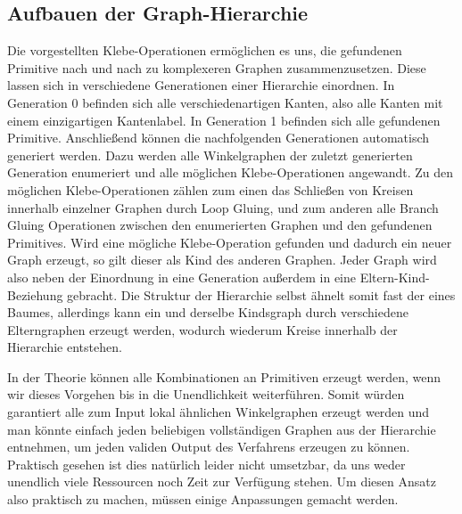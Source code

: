 \subsection{Aufbauen der Graph-Hierarchie}
Die vorgestellten Klebe-Operationen ermöglichen es uns, die gefundenen Primitive nach und nach zu komplexeren Graphen zusammenzusetzen.
Diese lassen sich in verschiedene Generationen einer Hierarchie einordnen. In Generation 0 befinden sich alle verschiedenartigen
Kanten, also alle Kanten mit einem einzigartigen Kantenlabel. In Generation 1 befinden sich alle gefundenen Primitive. Anschließend können
die nachfolgenden Generationen automatisch generiert werden. Dazu werden alle Winkelgraphen der zuletzt generierten Generation enumeriert
und alle möglichen Klebe-Operationen angewandt. Zu den möglichen Klebe-Operationen zählen zum einen das Schließen von Kreisen innerhalb einzelner
Graphen durch Loop Gluing, und zum anderen alle Branch Gluing Operationen zwischen den enumerierten Graphen und den gefundenen Primitives.
Wird eine mögliche Klebe-Operation gefunden und dadurch ein neuer Graph erzeugt, so gilt dieser als Kind des anderen Graphen. Jeder Graph wird
also neben der Einordnung in eine Generation außerdem in eine Eltern-Kind-Beziehung gebracht. Die Struktur der Hierarchie selbst ähnelt somit
fast der eines Baumes, allerdings kann ein und derselbe Kindsgraph durch verschiedene Elterngraphen erzeugt werden, wodurch wiederum Kreise
innerhalb der Hierarchie entstehen.

In der Theorie können alle Kombinationen an Primitiven erzeugt werden, wenn wir dieses Vorgehen bis in die Unendlichkeit weiterführen. Somit
würden garantiert alle zum Input lokal ähnlichen Winkelgraphen erzeugt werden und man könnte einfach jeden beliebigen vollständigen Graphen
aus der Hierarchie entnehmen, um jeden validen Output des Verfahrens erzeugen zu können. Praktisch gesehen ist dies natürlich leider nicht
umsetzbar, da uns weder unendlich viele Ressourcen noch Zeit zur Verfügung stehen. Um diesen Ansatz also praktisch zu machen, müssen einige
Anpassungen gemacht werden.

